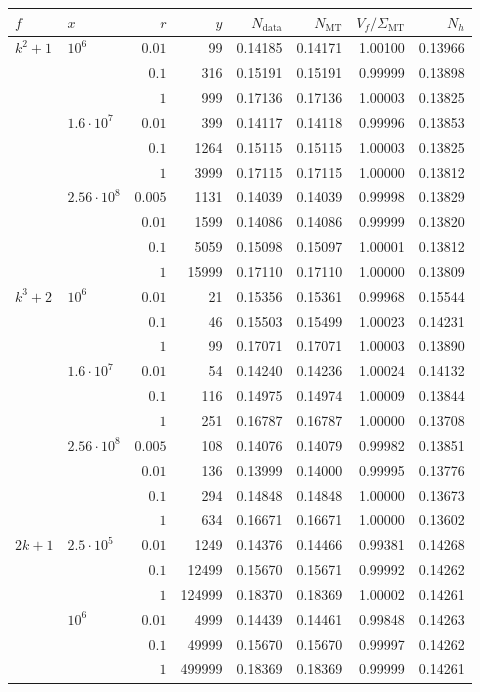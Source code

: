 \begin{tabular}{llrrrrrr}
\toprule
$f$ & $x$ & $r$ & $y$ & $N_{\mathrm{data}}$ & $N_{\mathrm{MT}}$ & $V_f/\Sigma_{\mathrm{MT}}$ & $N_h$ \\
\midrule
$k^2+1$ & $10^{6}$ & $0.01$ & 99 & 0.14185 & 0.14171 & 1.00100 & 0.13966 \\
 &  & $0.1$ & 316 & 0.15191 & 0.15191 & 0.99999 & 0.13898 \\
 &  & $1$ & 999 & 0.17136 & 0.17136 & 1.00003 & 0.13825 \\
 & $1.6\cdot 10^{7}$ & $0.01$ & 399 & 0.14117 & 0.14118 & 0.99996 & 0.13853 \\
 &  & $0.1$ & 1264 & 0.15115 & 0.15115 & 1.00003 & 0.13825 \\
 &  & $1$ & 3999 & 0.17115 & 0.17115 & 1.00000 & 0.13812 \\
 & $2.56\cdot 10^{8}$ & $0.005$ & 1131 & 0.14039 & 0.14039 & 0.99998 & 0.13829 \\
 &  & $0.01$ & 1599 & 0.14086 & 0.14086 & 0.99999 & 0.13820 \\
 &  & $0.1$ & 5059 & 0.15098 & 0.15097 & 1.00001 & 0.13812 \\
 &  & $1$ & 15999 & 0.17110 & 0.17110 & 1.00000 & 0.13809 \\
\midrule
$k^3+2$ & $10^{6}$ & $0.01$ & 21 & 0.15356 & 0.15361 & 0.99968 & 0.15544 \\
 &  & $0.1$ & 46 & 0.15503 & 0.15499 & 1.00023 & 0.14231 \\
 &  & $1$ & 99 & 0.17071 & 0.17071 & 1.00003 & 0.13890 \\
 & $1.6\cdot 10^{7}$ & $0.01$ & 54 & 0.14240 & 0.14236 & 1.00024 & 0.14132 \\
 &  & $0.1$ & 116 & 0.14975 & 0.14974 & 1.00009 & 0.13844 \\
 &  & $1$ & 251 & 0.16787 & 0.16787 & 1.00000 & 0.13708 \\
 & $2.56\cdot 10^{8}$ & $0.005$ & 108 & 0.14076 & 0.14079 & 0.99982 & 0.13851 \\
 &  & $0.01$ & 136 & 0.13999 & 0.14000 & 0.99995 & 0.13776 \\
 &  & $0.1$ & 294 & 0.14848 & 0.14848 & 1.00000 & 0.13673 \\
 &  & $1$ & 634 & 0.16671 & 0.16671 & 1.00000 & 0.13602 \\
\midrule
$2k+1$ & $2.5\cdot 10^{5}$ & $0.01$ & 1249 & 0.14376 & 0.14466 & 0.99381 & 0.14268 \\
 &  & $0.1$ & 12499 & 0.15670 & 0.15671 & 0.99992 & 0.14262 \\
 &  & $1$ & 124999 & 0.18370 & 0.18369 & 1.00002 & 0.14261 \\
 & $10^{6}$ & $0.01$ & 4999 & 0.14439 & 0.14461 & 0.99848 & 0.14263 \\
 &  & $0.1$ & 49999 & 0.15670 & 0.15670 & 0.99997 & 0.14262 \\
 &  & $1$ & 499999 & 0.18369 & 0.18369 & 0.99999 & 0.14261 \\
\bottomrule
\end{tabular}
